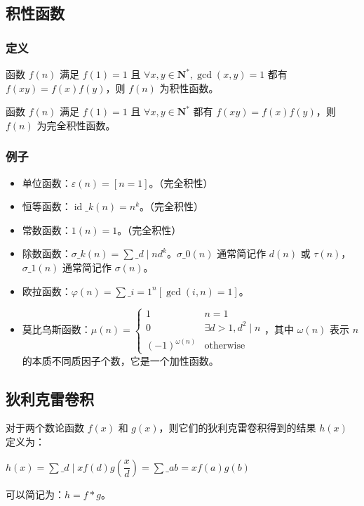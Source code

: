 \documentclass[UTF8]{ctexart}
\begin{document}
\begin{sloppypar}
\subsection{积性函数}

\subsubsection{定义}

函数 $f(n)$ 满足 $f(1)=1$ 且 $\forall x,y\in\mathbf{N}^*,\gcd(x,y)=1$ 都有 $f(xy)=f(x)f(y)$，则 $f(n)$ 为积性函数。

函数 $f(n)$ 满足 $f(1)=1$ 且 $\forall x,y\in\mathbf{N}^*$ 都有 $f(xy)=f(x)f(y)$，则 $f(n)$ 为完全积性函数。

\subsubsection{例子}

\begin{itemize}
   \item 单位函数：$\varepsilon(n)=[n=1]$。（完全积性）
   \item 恒等函数：$\operatorname{id}\_k(n)=n^k$。（完全积性）
   \item 常数函数：$1(n)=1$。（完全积性）
   \item 除数函数：$\sigma\_{k}(n)=\sum\_{d\mid n}d^{k}$。$\sigma\_{0}(n)$ 通常简记作 $d(n)$ 或 $\tau(n)$，$\sigma\_{1}(n)$ 通常简记作 $\sigma(n)$。
   \item 欧拉函数：$\varphi(n)=\sum\_{i=1}^n[\gcd(i,n)=1]$。
   \item 莫比乌斯函数：$\mu(n)=\begin{cases}1&n=1\\0&\exists d>1,d^{2}\mid n\\(-1)^{\omega(n)}&\text{otherwise}\end{cases}$，其中 $\omega(n)$ 表示 $n$ 的本质不同质因子个数，它是一个加性函数。
\end{itemize}

\subsection{狄利克雷卷积}

对于两个数论函数 $f(x)$ 和 $g(x)$，则它们的狄利克雷卷积得到的结果 $h(x)$ 定义为：

$h(x)=\sum\_{d\mid x}{f(d)g\left(\dfrac xd \right)}=\sum\_{ab=x}{f(a)g(b)}$

可以简记为：$h=f*g$。


\end{sloppypar}
\end{document}

